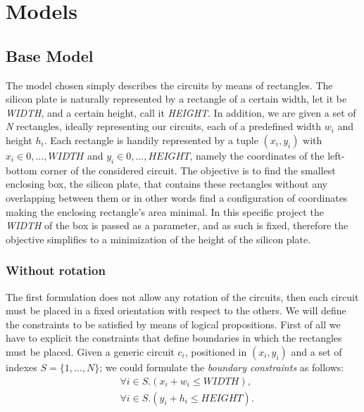 \section{Models}\label{models}

\subsection{Base Model}
The model chosen simply describes the circuits by means of rectangles. The silicon plate is naturally represented by a rectangle of a certain width, let it be \textit{WIDTH}, and a certain height, call it \textit{HEIGHT}. 
In addition, we are given a set of \emph{N} rectangles, ideally representing our circuits, each of a predefined width $w_i$ and height $h_i$. Each rectangle is handily represented by a tuple $(x_i, y_i)$ with $x_i \in 0,\dots, \textit{WIDTH}$ and $y_i \in 0,\dots, \textit{HEIGHT}$, namely the coordinates of the left-bottom corner of the considered circuit. The objective is to find the smallest enclosing box, the silicon plate, that contains these rectangles without any overlapping between them or in other words find a configuration of coordinates making the enclosing rectangle's area minimal. In this specific project the \textit{WIDTH} of the box is passed as a parameter, and as such is fixed, therefore the objective simplifies to a minimization of the height of the silicon plate. 

\bigskip

\subsubsection{Without rotation}\label{subsubsec:base-without-rot}
The first formulation does not allow any rotation of the circuits, then each circuit must be placed in a fixed orientation with respect to the others.
We will define the constraints to be satisfied by means of logical propositions. First of all we have to explicit the constraints that define boundaries in which the rectangles must be placed. Given a generic circuit $c_i$, positioned in $(x_i, y_i)$ and a set of indexes $S = \{1, \dots, N\}$; we could formulate the \textit{boundary constraints} as follows:
\begin{align}
    &\forall{i \in  S}.( x_i + w_i \leq \textit{WIDTH}),\\
    &\forall{i \in  S}.( y_i + h_i \leq \textit{HEIGHT}).
\end{align}

